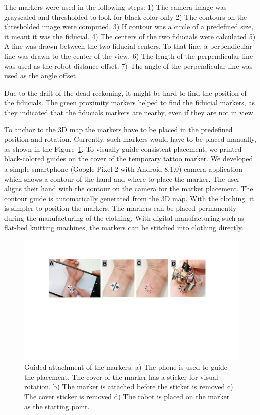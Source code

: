 The markers were used in the following steps:  
1) The camera image was grayscaled and thresholded to look for black color only 
2) The contours on the thresholded image were computed. 
3) If contour was a circle of a predefined size, it meant it was the fiducial. 
4) The centers of the two fiducials were calculated
5) A line was drawn between the two fiducial centers. To that line, a perpendicular line was drawn to the center of the view. 
6) The length of the perpendicular line was used as the robot distance offset. 
7) The angle of the perpendicular line was used as the angle offset. 

Due to the drift of the dead-reckoning, it might be hard to find the position of the fiducials. The green proximity markers helped to find the fiducial markers, as they indicated that the fiducials markers are nearby, even if they are not in view. 

To anchor to the 3D map the markers have to be placed in the predefined position and rotation. Currently, such markers would have to be placed manually, as shown in the Figure~\ref{fig:guide_markers}. To visually guide consistent placement, we printed black-colored guides on the cover of the temporary tattoo marker.  We developed a simple smartphone (Google Pixel 2 with Android 8.1.0) camera application which shows a contour of the hand and where to place the marker. The user aligns their hand with the contour on the camera for the marker placement.
The contour guide is automatically generated from the 3D map.
With the clothing, it is simpler to position the markers. The markers can be placed permanently during the manufacturing of the clothing. With digital manufacturing such as flat-bed knitting machines, the markers can be stitched into clothing directly. 





\begin{figure}[!ht]
\centering
\includegraphics[width=14.0cm]{pictures/chapter5/marker_placement.pdf}
\caption{Guided attachment of the markers. a) The phone is used to guide the placement. The cover of the marker has a sticker for visual rotation. b) The marker is attached before the sticker is removed c) The cover sticker is removed d) The robot is placed on the marker as the starting point.  }
\label{fig:guide_markers}
\end{figure}



